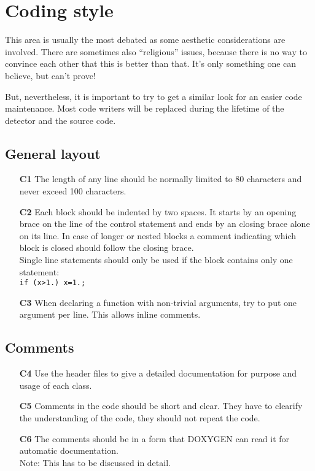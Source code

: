 \section{Coding style}

This area is usually the most debated as some aesthetic considerations are
involved. There are sometimes also ``religious'' issues, because there is no
way to convince each other that this is better than that. It's only something
one can believe, but can't prove!

But, nevertheless, it is important to try to get a similar look for an easier
code maintenance. Most code writers will be replaced during the lifetime of
the detector and the source code.

\subsection{General layout}
\begin{itemize}
\item[\bf C1] The length of any line should be normally limited to 80 characters
  and never exceed 100 characters.
\item[\bf C2] Each block should be indented by two spaces. It starts by an opening
  brace on the line of the control statement and ends by an closing brace alone
  on its line. In case of longer or nested blocks a comment indicating which 
  block is closed should follow the closing brace.\\
  Single line statements should only be used if the block contains only
  one statement:\\
  {\tt if (x>1.) x=1.;}
\item[\bf C3] When declaring a function with non-trivial arguments, try to
  put one argument per line. This allows inline comments.
\end{itemize}

\subsection{Comments}
\begin{itemize}
\item[\bf C4] Use the header files to give a detailed documentation for 
  purpose and usage of each class.
\item[\bf C5] Comments in the code should be short and clear. They have to
  clearify the understanding of the code, they should not repeat the code.
\item[\bf C6] The comments should be in a form that DOXYGEN can read it for
  automatic documentation.\\
  {\rm Note: This has to be discussed in detail.}
\end{itemize}

